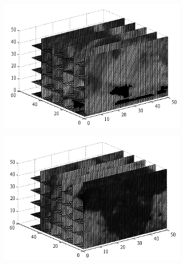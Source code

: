 \begin{figure}[h!]
        \centering
        \begin{subfigure}[b]{0.22\textwidth}
                \centering
                \includegraphics[width=\textwidth]{images/dot_product_image1}
                \subcaption{}
                \label{fig:dot-product-image1}
        \end{subfigure}
        \begin{subfigure}[b]{0.22\textwidth}
                \centering
                \includegraphics[width=\textwidth]{images/dot_product_image2}
                \subcaption{}
                \label{fig:dot-product-image2}
        \end{subfigure}
        \\ %
        \begin{subfigure}[b]{0.45\textwidth}

\end{subfigure}
\end{figure}
